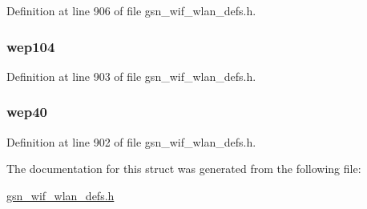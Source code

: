 Definition at line 906 of file gsn\_\-wif\_\-wlan\_\-defs.h.

\hypertarget{a00410_ab95f62b583a03134163d1f1fd4573a02}{
\subsubsection[{wep104}]{ {\bf wep104}}}
\label{a00410_ab95f62b583a03134163d1f1fd4573a02}


Definition at line 903 of file gsn\_\-wif\_\-wlan\_\-defs.h.

\hypertarget{a00410_af30857fde9d06828d91cff11936bee59}{
\subsubsection[{wep40}]{ {\bf wep40}}}
\label{a00410_af30857fde9d06828d91cff11936bee59}


Definition at line 902 of file gsn\_\-wif\_\-wlan\_\-defs.h.



The documentation for this struct was generated from the following file:\begin{DoxyCompactItemize}
\item 
\hyperlink{a00613}{gsn\_\-wif\_\-wlan\_\-defs.h}\end{DoxyCompactItemize}
